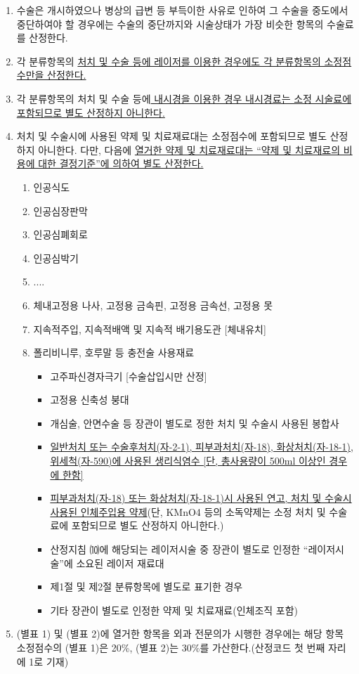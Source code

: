 \begin{enumerate}[(1)]
\item 수술은 개시하였으나 병상의 급변 등 부득이한 사유로 인하여 그 수술을 중도에서 중단하여야 할 경우에는 수술의 중단까지와 시술상태가 가장 비슷한 항목의 수술료를 산정한다.
\item 각 분류항목의 \uline{처치 및 수술 등에 레이저를 이용한 경우에도 각 분류항목의 소정점수만을 산정한다.}
\item 각 분류항목의 처치 및 수술 등에\uline{ 내시경을 이용한 경우 내시경료는 소정 시술료에 포함되므로 별도 산정하지 아니한다.}
\item 처치 및 수술시에 사용된 약제 및 치료재료대는 소정점수에 포함되므로 별도 산정하지 아니한다. 다만, 다음에 \uline{열거한 약제 및 치료재료대는 “약제 및 치료재료의 비용에 대한 결정기준”에 의하여 별도 산정한다.}
	\begin{enumerate}[①]\tightlist
	\item 인공식도
	\item 인공심장판막
	\item 인공심폐회로
	\item 인공심박기
	\item ....
	\item 체내고정용 나사, 고정용 금속핀, 고정용 금속선, 고정용 못
	\item 지속적주입, 지속적배액 및 지속적 배기용도관 [체내유치]
	\item 폴리비니루, 호루말 등 충전술 사용재료
		\begin{itemize}\tightlist
		\item 고주파신경자극기 [수술삽입시만 산정]
		\item 고정용 신축성 붕대
		\item 개심술, 안면수술 등 장관이 별도로 정한 처치 및 수술시 사용된 봉합사
		\item \uline{일반처치 또는 수술후처치(자-2-1), 피부과처치(자-18), 화상처치(자-18-1),위세척(자-590)에 사용된 생리식염수 [단, 총사용량이 500ml 이상인 경우에 한함] }
		\item \uline{피부과처치(자-18) 또는 화상처치(자-18-1)시 사용된 연고, 처치 및 수술시 사용된 인체주입용 약제}(단, KMnO4 등의 소독약제는 소정 처치 및 수술료에 포함되므로 별도 산정하지 아니한다.)
		\item 산정지침 ⑽에 해당되는 레이저시술 중 장관이 별도로 인정한 “레이저시술”에 소요된 레이저 재료대
		\item 제1절 및 제2절 분류항목에 별도로 표기한 경우
		\item 기타 장관이 별도로 인정한 약제 및 치료재료(인체조직 포함)
  		\end{itemize}
	\end{enumerate}  
\item (별표 1) 및 (별표 2)에 열거한 항목을 외과 전문의가 시행한 경우에는 해당 항목 소정점수의 (별표 1)은 20\%, (별표 2)는 30\%를 가산한다.(산정코드 첫 번째 자리에 1로 기재)
\end{enumerate}

